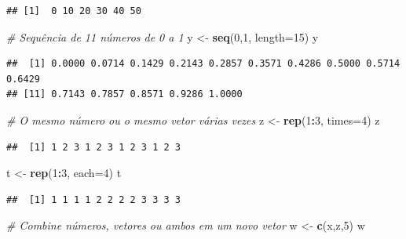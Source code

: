 \documentclass[
]{book}
\newenvironment{Shaded}{\begin{snugshade}}{\end{snugshade}}
\newcommand{\AttributeTok}[1]{\textcolor[rgb]{0.13,0.29,0.53}{#1}}
\newcommand{\CommentTok}[1]{\textcolor[rgb]{0.56,0.35,0.01}{\textit{#1}}}
\newcommand{\DecValTok}[1]{\textcolor[rgb]{0.00,0.00,0.81}{#1}}
\newcommand{\FunctionTok}[1]{\textcolor[rgb]{0.13,0.29,0.53}{\textbf{#1}}}
\newcommand{\NormalTok}[1]{#1}
\newcommand{\OtherTok}[1]{\textcolor[rgb]{0.56,0.35,0.01}{#1}}
\newcommand{\SpecialCharTok}[1]{\textcolor[rgb]{0.81,0.36,0.00}{\textbf{#1}}}
\theoremstyle{definition}
\theoremstyle{definition}
\theoremstyle{definition}
\theoremstyle{definition}
\theoremstyle{remark}
\begin{document}
\begin{verbatim}
## [1]  0 10 20 30 40 50
\end{verbatim}

\begin{Shaded}
\begin{Highlighting}[]
\CommentTok{\# Sequência de 11 números de 0 a 1}
\NormalTok{y }\OtherTok{\textless{}{-}} \FunctionTok{seq}\NormalTok{(}\DecValTok{0}\NormalTok{,}\DecValTok{1}\NormalTok{, }\AttributeTok{length=}\DecValTok{15}\NormalTok{)}
\NormalTok{y}
\end{Highlighting}
\end{Shaded}

\begin{verbatim}
##  [1] 0.0000 0.0714 0.1429 0.2143 0.2857 0.3571 0.4286 0.5000 0.5714 0.6429
## [11] 0.7143 0.7857 0.8571 0.9286 1.0000
\end{verbatim}

\begin{Shaded}
\begin{Highlighting}[]
\CommentTok{\# O mesmo número ou o mesmo vetor várias vezes}
\NormalTok{z }\OtherTok{\textless{}{-}} \FunctionTok{rep}\NormalTok{(}\DecValTok{1}\SpecialCharTok{:}\DecValTok{3}\NormalTok{, }\AttributeTok{times=}\DecValTok{4}\NormalTok{)}
\NormalTok{z}
\end{Highlighting}
\end{Shaded}

\begin{verbatim}
##  [1] 1 2 3 1 2 3 1 2 3 1 2 3
\end{verbatim}

\begin{Shaded}
\begin{Highlighting}[]
\NormalTok{t }\OtherTok{\textless{}{-}} \FunctionTok{rep}\NormalTok{(}\DecValTok{1}\SpecialCharTok{:}\DecValTok{3}\NormalTok{, }\AttributeTok{each=}\DecValTok{4}\NormalTok{)}
\NormalTok{t}
\end{Highlighting}
\end{Shaded}

\begin{verbatim}
##  [1] 1 1 1 1 2 2 2 2 3 3 3 3
\end{verbatim}

\begin{Shaded}
\begin{Highlighting}[]
\CommentTok{\# Combine números, vetores ou ambos em um novo vetor}
\NormalTok{w }\OtherTok{\textless{}{-}} \FunctionTok{c}\NormalTok{(x,z,}\DecValTok{5}\NormalTok{)}
\NormalTok{w}
\end{Highlighting}
\end{Shaded}
\end{document}
